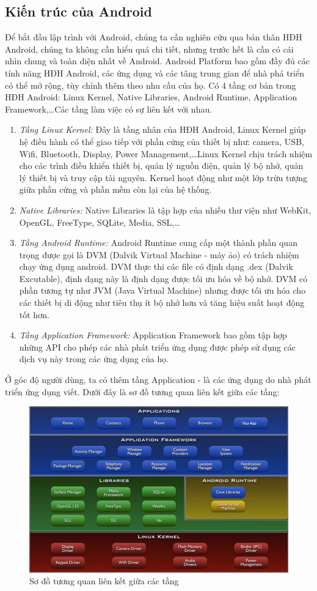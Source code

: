 \subsection{Kiến trúc của Android}
Để bắt đầu lập trình với Android, chúng ta cần nghiên cứu qua bản thân HĐH Android, chúng ta không cần hiểu quá chi tiết, nhưng trước hết là cần có cái nhìn chung và toàn diện nhất về Android.
\newline
Android Platform bao gồm đầy đủ các tính năng HĐH Android, các ứng dụng và các tâng trung gian để nhà phá triển có thể mở rộng, tùy chỉnh thêm theo nhu cầu của họ. Có 4 tầng cơ bản trong HĐH Android: Linux Kernel, Native Libraries, Android Runtime, Application Framework,\dots Các tầng làm việc có sự liên kết với nhau.
\begin{enumerate}
    \item{\textit{Tầng Linux Kernel:}}
    Đây là tầng nhân của HĐH Android, Linux Kernel giúp hệ điều hành có thể giao tiếp với phần cứng của thiết bị như: camera,  USB, Wifi, Bluetooth, Display, Power Management,\dots  Linux Kernel chịu trách nhiệm cho các trình điều khiển thiết bị, quản lý nguồn điện, quản lý bộ nhớ, quản lý thiết bị và truy cập tài nguyên. Kernel hoạt động như một lớp trừu tượng giữa phần cứng và phần mềm còn lại của hệ thống.
    \item{\textit{Native Libraries:}}
    Native Libraries là tập hợp của nhiều thư viện như WebKit, OpenGL, FreeType, SQLite, Media, SSL,\dots 
    \item{\textit{Tầng Android Runtime:}}
    Android Runtime cung cấp một thành phần quan trọng được gọi là DVM (Dalvik Virtual Machine - máy ảo) có trách nhiệm chạy ứng dụng android.
    DVM thực thi các file có định dạng .dex (Dalvik Excutable), định dạng này là định dạng được tối ưu hóa về bộ nhớ.
    \newline
    DVM có phần tương tự như JVM (Java Virtual Machine) nhưng được tối ưu hóa cho các thiết bị di động như tiêu thụ ít bộ nhớ hơn và tăng hiệu suất hoạt động tốt hơn.
    \item{\textit{Tầng Application Framework:}}
    Application Framework bao gồm tập hợp những API cho phép các nhà phát triển ứng dụng được phép sử dụng các dịch vụ này trong các ứng dụng của họ.
\end{enumerate}
Ở góc độ người dùng, ta có thêm tầng Application - là các ứng dụng do nhà phát triển ứng dụng viết. Dưới đây là sơ đồ tương quan liên kết giữa các tầng:
\newline
\begin{figure}[!ht]
    \centering
    \includegraphics[scale=0.5]{images/android-flatform.jpg}
    \caption{Sơ đồ tương quan liên kết giữa các tầng}
\end{figure}



